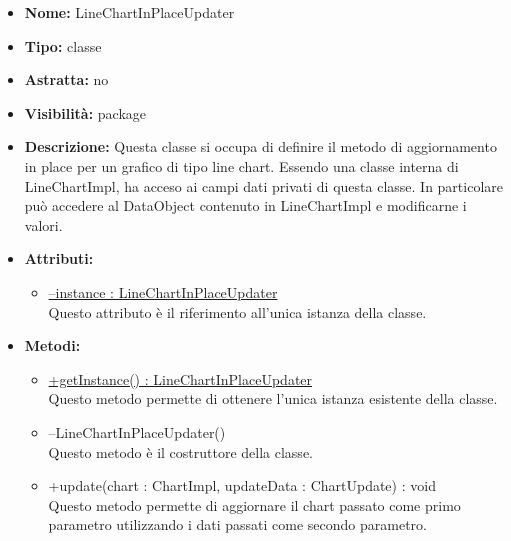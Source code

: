 	
			
			\begin{itemize}
			\item \textbf{Nome:} LineChartInPlaceUpdater
			\item \textbf{Tipo:} classe
			
		\item \textbf{Astratta:}
		no
			\item \textbf{Visibilità:} package
			\item \textbf{Descrizione:} Questa classe si occupa di definire il metodo di aggiornamento in place per un grafico di tipo line chart. Essendo una classe interna di LineChartImpl, ha acceso ai campi dati privati di questa classe. In particolare può accedere al DataObject contenuto in LineChartImpl e modificarne i valori.
			\item \textbf{Attributi:}
				\begin{itemize}
				\setlength{\itemsep}{5pt}
				
					\item[\ding{111}] \underline{--instance : LineChartInPlaceUpdater} \\ [1mm] Questo attributo è il riferimento all'unica istanza della classe.
				\end{itemize}
		
			\item \textbf{Metodi:}
				\begin{itemize}
				\setlength{\itemsep}{5pt}
				
					\item[\ding{111}] {\underline{+getInstance() : LineChartInPlaceUpdater}} \\ [1mm] Questo metodo permette di ottenere l'unica istanza esistente della classe.
					\item[\ding{111}] {{--LineChartInPlaceUpdater()}} \\ [1mm] Questo metodo è il costruttore della classe.
					\item[\ding{111}] {{+update(chart : ChartImpl, updateData : ChartUpdate) : void}} \\ [1mm] Questo metodo permette di aggiornare il chart passato come primo parametro utilizzando i dati passati come secondo parametro.
				\end{itemize}
		
			\end{itemize}

